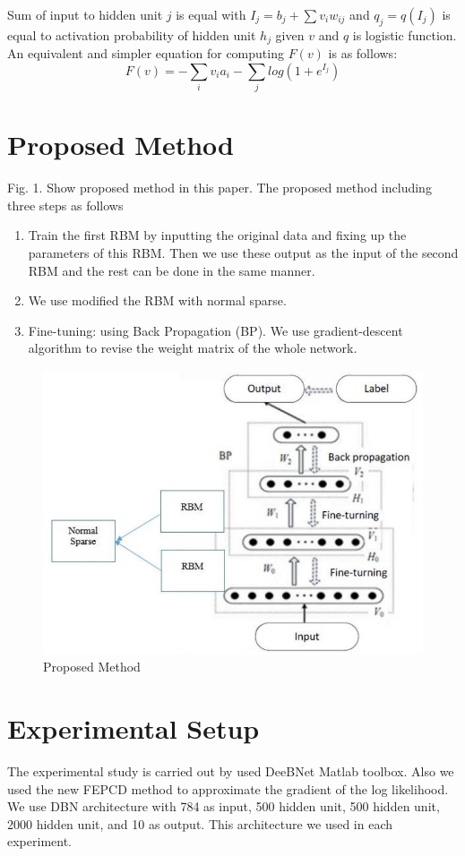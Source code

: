 \documentclass[conference]{IEEEtran}
\begin{document}
Sum of input to hidden unit $j$ is equal with $I_{j}=b_{j}+\sum v_{i}w_{ij}$
and $q_{j}=q(I_{j})$ is equal to activation probability of hidden unit
$h_{j}$ given $v$ and $q$ is logistic function. An equivalent and
simpler equation for computing $F(v)$ is as follows:
\begin{equation}
F(v)=-\sum_{i}v_{i}a_{i}-\sum_{j}log(1+e^{I_{j}})
\end{equation}
\section{Proposed Method}
Fig. 1. Show proposed method in this paper. The proposed
method including three steps as follows
\begin{enumerate}
	\item Train the first RBM by inputting the original data and
	fixing up the parameters of this RBM. Then we use
	these output as the input of the second RBM and the
	rest can be done in the same manner.
	\item We use modified the RBM with normal sparse.
	\item Fine-tuning: using Back Propagation (BP). We use
	gradient-descent algorithm to revise the weight
	matrix of the whole network.
	
\end{enumerate}

\begin{figure}[h]
	\centering
	\includegraphics[width=.5\textwidth]{pics/proposedMethod.jpg}
	\caption{Proposed Method}
	\label{fig1}
\end{figure}

\section{Experimental Setup}
The experimental study is carried out by used DeeBNet
Matlab toolbox\cite{keyvanrad3}. Also we used the new FEPCD method to
approximate the gradient of the log likelihood.
We use DBN architecture with 784 as input, 500 hidden
unit, 500 hidden unit, 2000 hidden unit, and 10 as output. This
architecture we used in each experiment.
\end{document}
